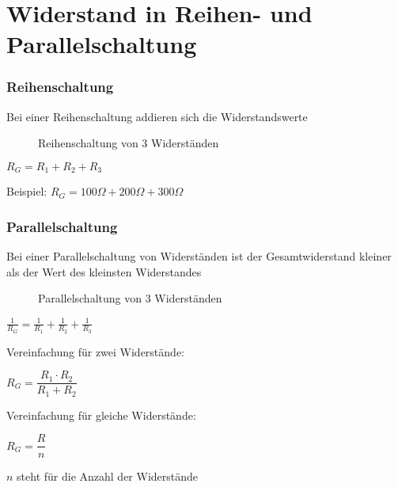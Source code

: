 
\section{Widerstand in Reihen- und Parallelschaltung}
\label{section:reihe_parallel_widerstand}
\begin{frame}%

\frametitle{Reihenschaltung}
Bei einer Reihenschaltung addieren sich die Widerstandswerte


\begin{figure}
    \caption{\scriptsize Reihenschaltung von 3 Widerständen}
    \label{e_reihenschaltung_von_r}
\end{figure}

$R_{ G } = R_{ 1 } + R_{ 2 } + R_{ 3 }$

Beispiel: $R_{ G } = 100 \Omega + 200 \Omega + 300 \Omega$

\end{frame}

\begin{frame}
\frametitle{Parallelschaltung}
Bei einer Parallelschaltung von Widerständen ist der Gesamtwiderstand kleiner als der Wert des kleinsten Widerstandes


\begin{figure}
    \caption{\scriptsize Parallelschaltung von 3 Widerständen}
    \label{e_parallelschaltung_von_r}
\end{figure}

$\frac{ 1 }{ R_{ G } } = \frac{ 1 }{ R_{ 1 } } + \frac{ 1 }{ R_{ 2 } } + \frac{ 1 }{ R_{ 3 } }$

\end{frame}

\begin{frame}Vereinfachung für zwei Widerstände:

$R_{ G } = \dfrac{ R_{ 1 } \cdot R_{ 2 } }{ R_{ 1 } + R_{ 2 }}$

\end{frame}

\begin{frame}Vereinfachung für gleiche Widerstände:

$R_{ G } = \dfrac{ R }{ n }$

$n$ steht für die Anzahl der Widerstände

\end{frame}

